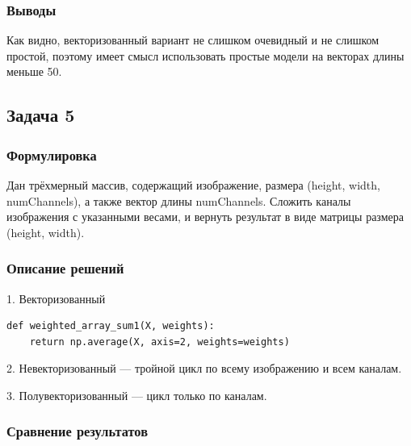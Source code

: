 \documentclass[12pt]{article}
\begin{document}
\subsubsection*{Выводы}

Как видно, векторизованный вариант не слишком очевидный и не слишком простой, поэтому имеет смысл использовать простые модели на векторах длины меньше 50.

\subsection{Задача 5}

\subsubsection*{Формулировка}

Дан трёхмерный массив, содержащий изображение, размера (height, width, numChannels), а также вектор длины numChannels. Сложить каналы изображения с указанными весами, и вернуть результат в виде матрицы размера (height, width).

\subsubsection*{Описание решений}

1. Векторизованный
\begin{lstlisting}
def weighted_array_sum1(X, weights):
    return np.average(X, axis=2, weights=weights)
\end{lstlisting}

2. Невекторизованный --- тройной цикл по всему изображению и всем каналам.

3. Полувекторизованный --- цикл только по каналам.

\newpage

\subsubsection*{Сравнение результатов}
\end{document}
